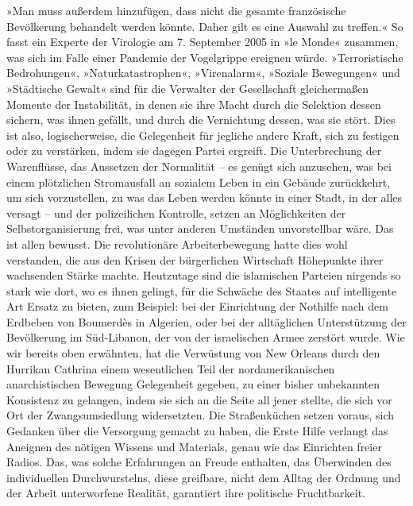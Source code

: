 »Man muss außerdem hinzufügen, dass nicht die gesamte französische
Bevölkerung behandelt werden könnte. Daher gilt es eine Auswahl zu
treffen.« So fasst ein Experte der Virologie am 7. September 2005
in »le Monde« zusammen, was sich im Falle einer Pandemie der
Vogelgrippe ereignen würde. »Terroristische Bedrohungen«,
»Naturkatastrophen«, »Virenalarm«, »Soziale Bewegungen« und
»Städtische Gewalt« sind für die Verwalter der Gesellschaft
gleichermaßen Momente der Instabilität, in denen sie ihre Macht
durch die Selektion dessen sichern, was ihnen gefällt, und durch
die Vernichtung dessen, was sie stört. Dies ist also,
logischerweise, die Gelegenheit für jegliche andere Kraft, sich zu
festigen oder zu verstärken, indem sie dagegen Partei ergreift. Die
Unterbrechung der Warenflüsse, das Aussetzen der Normalität – es
genügt sich anzusehen, was bei einem plötzlichen Stromausfall an
sozialem Leben in ein Gebäude zurückkehrt, um sich vorzustellen, zu
was das Leben werden könnte in einer Stadt, in der alles versagt –
und der polizeilichen Kontrolle, setzen an Möglichkeiten der
Selbstorganisierung frei, was unter anderen Umständen unvorstellbar
wäre. Das ist allen bewusst. Die revolutionäre Arbeiterbewegung
hatte dies wohl verstanden, die aus den Krisen der bürgerlichen
Wirtschaft Höhepunkte ihrer wachsenden Stärke machte. Heutzutage
sind die islamischen Parteien nirgends so stark wie dort, wo es
ihnen gelingt, für die Schwäche des Staates auf intelligente Art
Ersatz zu bieten, zum Beispiel: bei der Einrichtung der Nothilfe
nach dem Erdbeben von Boumerdès in Algerien, oder bei der
alltäglichen Unterstützung der Bevölkerung im Süd-Libanon, der von
der israelischen Armee zerstört wurde.
Wie wir bereits oben erwähnten, hat die Verwüstung von New Orleans
durch den Hurrikan Cathrina einem wesentlichen Teil der
nordamerikanischen anarchistischen Bewegung Gelegenheit gegeben, zu
einer bisher unbekannten Konsistenz zu gelangen, indem sie sich an
die Seite all jener stellte, die sich vor Ort der Zwangsumsiedlung
widersetzten. Die Straßenküchen setzen voraus, sich Gedanken über
die Versorgung gemacht zu haben, die Erste Hilfe verlangt das
Aneignen des nötigen Wissens und Materials, genau wie das
Einrichten freier Radios. Das, was solche Erfahrungen an Freude
enthalten, das Überwinden des individuellen Durchwurstelns, diese
greifbare, nicht dem Alltag der Ordnung und der Arbeit unterworfene
Realität, garantiert ihre politische Fruchtbarkeit.

